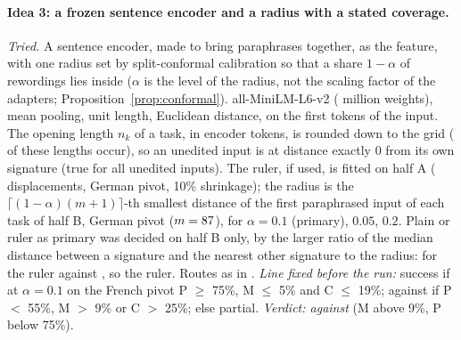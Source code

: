 \paragraph{Idea 3: a frozen sentence encoder and a radius with a stated coverage.} \emph{Tried.} A sentence encoder, made to bring paraphrases together, as the feature, with one radius set by split-conformal calibration so that a share $1 - \alpha$ of rewordings lies inside ($\alpha$ is the level of the radius, not the scaling factor of the adapters; Proposition~\ref{prop:conformal}). all-MiniLM-L6-v2 (\WidenEncParams{} million weights), mean pooling, unit length, Euclidean distance, on the first tokens of the input. The opening length $n_k$ of a task, in encoder tokens, is rounded down to the grid \WidenEncGrid{} (\WidenEncPrefixes{} of these lengths occur), so an unedited input is at distance exactly 0 from its own signature (true for all \WidenEncUneditedZero{} unedited inputs). The ruler, if used, is fitted on half A (\WidenEncDisplacements{} displacements, German pivot, 10\% shrinkage); the radius is the $\lceil (1-\alpha)(m+1) \rceil$-th smallest distance of the first paraphrased input of each task of half B, German pivot ($m = 87{}$), for $\alpha = 0.1$ (primary), $0.05$, $0.2$. Plain or ruler as primary was decided on half B only, by the larger ratio of the median distance between a signature and the nearest other signature to the radius: \WidenEncRatioRuler{} for the ruler against \WidenEncRatioPlain{}, so the ruler. Routes as in \cert{}.
\emph{Line fixed before the run:} success if at $\alpha = 0.1$ on the French pivot \textsf{P} $\ge$ 75\%, \textsf{M} $\le$ 5\% and \textsf{C} $\le$ 19\%; against if \textsf{P} $<$ 55\%, \textsf{M} $>$ 9\% or \textsf{C} $>$ 25\%; else partial. \emph{Verdict: against} (\textsf{M} above 9\%, \textsf{P} below 75\%).
